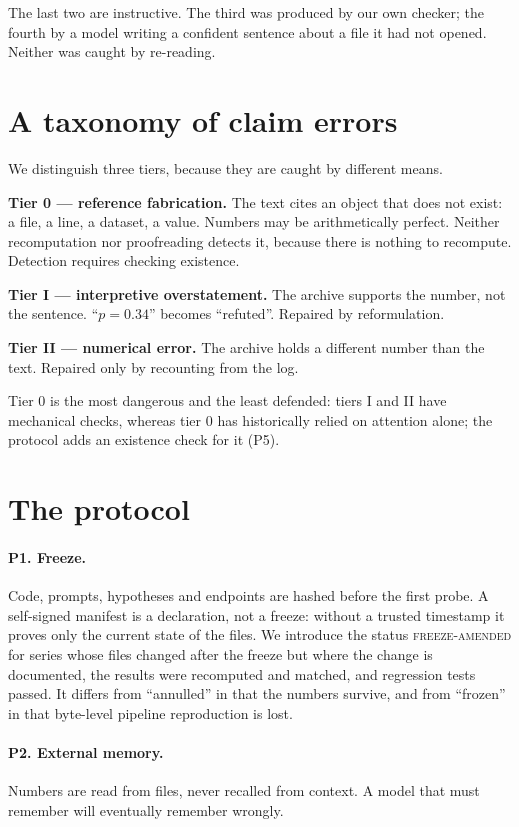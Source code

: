 \documentclass[11pt]{article}
\begin{document}
The last two are instructive. The third was produced by our own checker; the
fourth by a model writing a confident sentence about a file it had not opened.
Neither was caught by re-reading.

\section{A taxonomy of claim errors}
\label{sec:taxonomy}

We distinguish three tiers, because they are caught by different means.

\textbf{Tier 0 --- reference fabrication.} The text cites an object that does
not exist: a file, a line, a dataset, a value. Numbers may be arithmetically
perfect. Neither recomputation nor proofreading detects it, because there is
nothing to recompute. Detection requires checking existence.

\textbf{Tier I --- interpretive overstatement.} The archive supports the number,
not the sentence. ``$p = 0.34$'' becomes ``refuted''. Repaired by
reformulation.

\textbf{Tier II --- numerical error.} The archive holds a different number than
the text. Repaired only by recounting from the log.

Tier 0 is the most dangerous and the least defended: tiers I and II have
mechanical checks, whereas tier 0 has historically relied on attention alone;
the protocol adds an existence check for it (P5).

\section{The protocol}

\paragraph{P1. Freeze.} Code, prompts, hypotheses and endpoints are hashed
before the first probe. A self-signed manifest is a declaration, not a freeze:
without a trusted timestamp it proves only the current state of the files. We
introduce the status \textsc{freeze-amended} for series whose files changed
after the freeze but where the change is documented, the results were recomputed
and matched, and regression tests passed. It differs from ``annulled'' in that
the numbers survive, and from ``frozen'' in that byte-level pipeline
reproduction is lost.

\paragraph{P2. External memory.} Numbers are read from files, never recalled
from context. A model that must remember will eventually remember wrongly.
\end{document}

